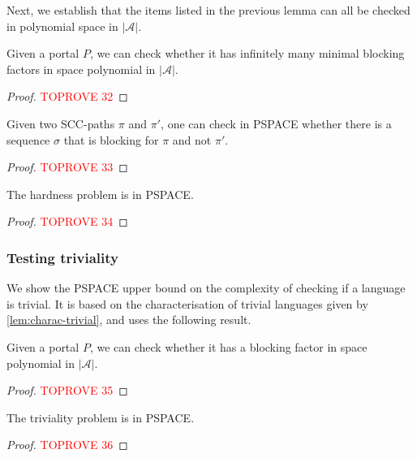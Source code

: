 \documentclass[letterpaper, USenglish, cleveref, autoref, thm-restate, numberwithinsect]{lipics-v2021}
\theoremstyle{theorem}
\theoremstyle{definition}
\newcommand{\Aa}{\mathcal{A}}
\newcommand{\PSPACE}{\textsf{PSPACE}\xspace}
\newcommand{\SCCpath}{\pi}
\begin{document}
Next, we establish that the items listed in the previous lemma can all be checked in polynomial space in $|\Aa|$.

\begin{lemma}
	\label{lem:aut-block-fact}
	Given a portal $P$, we can check whether it has infinitely many minimal blocking factors in space polynomial in $|\Aa|$.
\end{lemma}

\begin{proof}\textcolor{red}{TOPROVE 32}\end{proof}

\begin{lemma}
	\label{lem:PSPACE-blocking-for-one}
	Given two SCC-paths $\SCCpath$ and $\SCCpath'$, one can check in \PSPACE whether there is a sequence $\sigma$ that is blocking for $\SCCpath$ and not $\SCCpath'$.
\end{lemma}
\begin{proof}\textcolor{red}{TOPROVE 33}\end{proof}

\begin{proposition}
	\label{prop:hard-to-test-PSPACE}
	The hardness problem is in \PSPACE.
\end{proposition}
\begin{proof}\textcolor{red}{TOPROVE 34}\end{proof}


\subsubsection{Testing triviality}

We show the \PSPACE upper bound on the complexity of checking if a language is trivial.
It is based on the characterisation of trivial languages given by \cref{lem:charac-trivial}, and uses the following result.

\begin{lemma}
	\label{lem:exists-blocking-fact}
	Given a portal $P$, we can check whether it has a blocking factor in space polynomial in $|\Aa|$.
\end{lemma}
\begin{proof}\textcolor{red}{TOPROVE 35}\end{proof}


\begin{proposition}\label{prop:trivial-PSPACE}
	The triviality problem is in \PSPACE.
\end{proposition}
\begin{proof}\textcolor{red}{TOPROVE 36}\end{proof}
\end{document}
